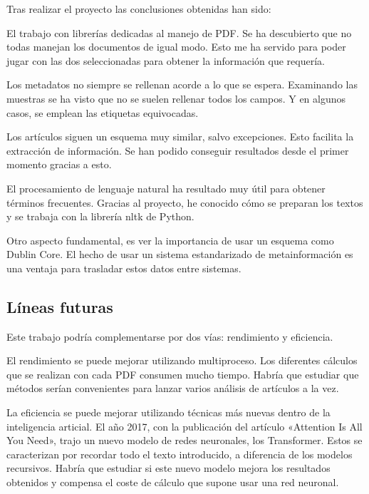 \documentclass[../main.tex]{subfiles}
\begin{document}
Tras realizar el proyecto las conclusiones obtenidas han sido:

El trabajo con librerías dedicadas al manejo de PDF. Se ha descubierto que no todas manejan los documentos de igual modo. Esto me ha servido para poder jugar con las dos seleccionadas para obtener la información que requería.

Los metadatos no siempre se rellenan acorde a lo que se espera. Examinando las muestras se ha visto que no se suelen rellenar todos los campos. Y en algunos casos, se emplean las etiquetas equivocadas.

Los artículos siguen un esquema muy similar, salvo excepciones. Esto facilita la extracción de información. Se han podido conseguir resultados desde el primer momento gracias a esto.

El procesamiento de lenguaje natural ha resultado muy útil para obtener términos frecuentes. Gracias al proyecto, he conocido cómo se preparan los textos y se trabaja con la librería nltk de Python.

Otro aspecto fundamental, es ver la importancia de usar un esquema como Dublin Core. El hecho de usar un sistema estandarizado de metainformación es una ventaja para trasladar estos datos entre sistemas.

\subsection{Líneas futuras}

Este trabajo podría complementarse por dos vías: rendimiento y eficiencia.

El rendimiento se puede mejorar utilizando multiproceso. Los diferentes cálculos que se realizan con cada PDF consumen mucho tiempo. Habría que estudiar que métodos serían convenientes para lanzar varios análisis de artículos a la vez.

La eficiencia se puede mejorar utilizando técnicas más nuevas dentro de la inteligencia articial. El año 2017, con la publicación del artículo «Attention Is All You Need», trajo un nuevo modelo de redes neuronales, los Transformer. Estos se caracterizan por recordar todo el texto introducido, a diferencia de los modelos recursivos. Habría que estudiar si este nuevo modelo mejora los resultados obtenidos y compensa el coste de cálculo que supone usar una red neuronal.
\end{document}

